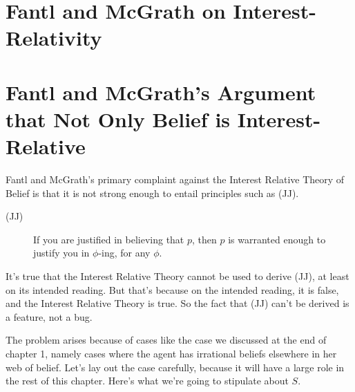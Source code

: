 \section{Fantl and McGrath on Interest-Relativity}

\section{Fantl and McGrath's Argument that Not Only Belief is Interest-Relative}

Fantl and McGrath's primary complaint against the Interest Relative Theory of Belief is that it is not strong enough to entail principles such as (JJ).

\begin{description}
\item[(JJ)] If you are justified in believing that \(p\), then \(p\) is warranted enough to justify you in \(\phi\)-ing, for any \(\phi\). \cite[99]{FantlMcGrath2009}
\end{description}

\noindent It's true that the Interest Relative Theory cannot be used to derive (JJ), at least on its intended reading. But that's because on the intended reading, it is false, and the Interest Relative Theory is true. So the fact that (JJ) can't be derived is a feature, not a bug.

The problem arises because of cases like the case we discussed at the end of chapter 1, namely cases where the agent has irrational beliefs elsewhere in her web of belief. Let's lay out the case carefully, because it will have a large role in the rest of this chapter. Here's what we're going to stipulate about \(S\).

